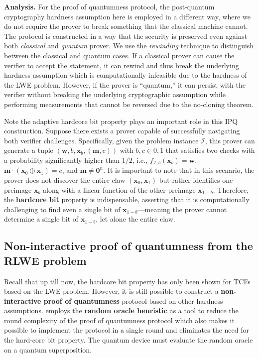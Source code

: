 \documentclass[cryptography,review,submit,pdftex,moreauthors,amsmath,amssymb,aps,strict]{Definitions/mdpi}
\begin{document}
\noindent\textbf{Analysis.} For the proof of quantumness protocol, the post-quantum cryptography hardness assumption here is employed in a different way, where we do not require the prover to break something that the classical machine cannot. The protocol is constructed in a way that the security is preserved even against both \textit{classical} and \textit{quantum} prover. We use the \textit{rewinding} technique to distinguish between the classical and quantum cases. If a classical prover can cause the verifier to accept the statement, it can rewind and thus break the underlying hardness assumption which is computationally infeasible due to the hardness of the LWE problem. However, if the prover is ``quantum,'' it can persist with the verifier without breaking the underlying cryptographic assumption while performing measurements that cannot be reversed due to the no-cloning theorem.

Note the adaptive hardcore bit property plays an important role in this IPQ construction. Suppose there exists a prover capable of successfully navigating both verifier challenges. Specifically, given the problem instance $\mathcal{I}$, this prover can generate a tuple $(\mathbf{w}, b, \mathbf{x}_b, (\mathbf{m}, c))$ with $b,c \in {0,1}$ that satisfies two checks with a probability significantly higher than $1/2$, i.e., $f_{\mathcal{I},b}(\mathbf{x}_b) = \mathbf{w}$, $\mathbf{m} \cdot (\mathbf{x}_0 \oplus \mathbf{x}_1) = c$, and $\mathbf{m} \neq \mathbf{0}^n$.
It is important to note that in this scenario, the prover does not discover the entire claw $(\mathbf{x}_0, \mathbf{x}_1)$ but rather identifies one preimage $\mathbf{x}_b$ along with a linear function of the other preimage $\mathbf{x}_{1-b}$. Therefore, the \textbf{hardcore bit} property is indispensable, asserting that it is computationally challenging to find even a single bit of $\mathbf{x}_{1-b}$—meaning the prover cannot determine a single bit of $\mathbf{x}_{1-b}$, let alone the entire claw. 


\subsection{Non-interactive proof of quantumness from the RLWE problem}

Recall that up till now, the hardcore bit property has only been shown for TCFs based on the LWE problem. However, it is still possible to construct a \textbf{non-interactive proof of quantumness} protocol based on other hardness assumptions. \cite{BrakerskiProofofQuantumness} employs the \textbf{random oracle heuristic} as a tool to reduce the round complexity of the proof of quantumness protocol which also makes it possible to implement the protocol in a single round and eliminates the need for the hard-core bit property. The quantum device must evaluate the random oracle on a quantum superposition.
\end{document}
